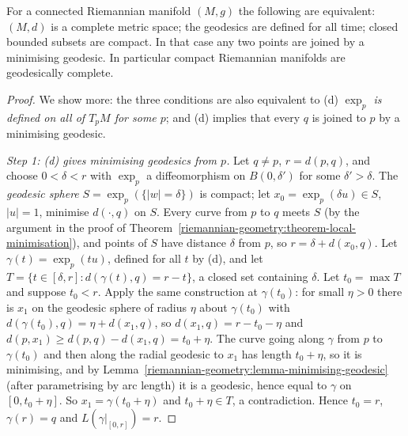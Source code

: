 \begin{theorem}\label{riemannian-geometry:theorem-hopf-rinow}
For a connected Riemannian manifold $(M, g)$ the following are equivalent: $(M, d)$ is a complete metric space; the geodesics are defined for all time; closed bounded subsets are compact. In that case any
two points are joined by a minimising geodesic. In particular compact Riemannian manifolds are geodesically complete.
\end{theorem}

\begin{proof}
We show more: the three conditions are also equivalent to (d) \emph{$\exp_p$ is defined on all of $T_pM$ for some $p$}; and (d) implies that every $q$ is joined to $p$ by a minimising geodesic.

\emph{Step 1: (d) gives minimising geodesics from $p$.} Let $q \neq p$, $r = d(p, q)$, and choose $0 < \delta < r$ with $\exp_p$ a diffeomorphism on $B(0, \delta')$ for some $\delta' > \delta$. The \emph{geodesic sphere}
$S = \exp_p(\{|w| = \delta\})$ is compact; let $x_0 = \exp_p(\delta u) \in S$, $|u| = 1$, minimise $d(\cdot, q)$ on $S$. Every curve from $p$ to $q$ meets $S$ (by the argument in the proof of
Theorem~\ref{riemannian-geometry:theorem-local-minimisation}), and points of $S$ have distance $\delta$ from $p$, so $r = \delta + d(x_0, q)$. Let $\gamma(t) = \exp_p(tu)$, defined for all $t$ by (d), and let
$T = \{t \in [\delta, r] : d(\gamma(t), q) = r - t\}$, a closed set containing $\delta$. Let $t_0 = \max T$ and suppose $t_0 < r$. Apply the same construction at $\gamma(t_0)$: for small $\eta > 0$ there is $x_1$ on the geodesic sphere of
radius $\eta$ about $\gamma(t_0)$ with $d(\gamma(t_0), q) = \eta + d(x_1, q)$, so $d(x_1, q) = r - t_0 - \eta$ and $d(p, x_1) \geq d(p, q) - d(x_1, q) = t_0 + \eta$. The curve going along $\gamma$ from $p$ to $\gamma(t_0)$ and then along the
radial geodesic to $x_1$ has length $t_0 + \eta$, so it is minimising, and by Lemma~\ref{riemannian-geometry:lemma-minimising-geodesic} (after parametrising by arc length) it is a geodesic, hence equal to $\gamma$ on $[0, t_0 + \eta]$.
So $x_1 = \gamma(t_0 + \eta)$ and $t_0 + \eta \in T$, a contradiction. Hence $t_0 = r$, $\gamma(r) = q$ and $L(\gamma|_{[0, r]}) = r$.


\end{proof}
